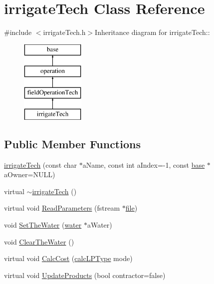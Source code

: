 \hypertarget{classirrigate_tech}{
\section{irrigateTech Class Reference}
\label{classirrigate_tech}
}


{\ttfamily \#include $<$irrigateTech.h$>$}Inheritance diagram for irrigateTech::\begin{figure}[H]
\begin{center}
\leavevmode
\includegraphics[height=4cm]{classirrigate_tech}
\end{center}
\end{figure}
\subsection*{Public Member Functions}
\begin{DoxyCompactItemize}
\item 
\hyperlink{classirrigate_tech_a2a3114ef17127272f1b30d7e50404f34}{irrigateTech} (const char $\ast$aName, const int aIndex=-\/1, const \hyperlink{classbase}{base} $\ast$aOwner=NULL)
\item 
virtual \hyperlink{classirrigate_tech_a54d46070621b3e40e31c8737626b9ba7}{$\sim$irrigateTech} ()
\item 
virtual void \hyperlink{classirrigate_tech_a8c7f11f2ce9cb7e19851c81c69c91d0a}{ReadParameters} (fstream $\ast$\hyperlink{classbase_a3af52ee9891719d09b8b19b42450b6f6}{file})
\item 
void \hyperlink{classirrigate_tech_a762110b6144118044760d998985175f0}{SetTheWater} (\hyperlink{classwater}{water} $\ast$aWater)
\item 
void \hyperlink{classirrigate_tech_a9daf92a6cfd801082fd3201fd7e4e572}{ClearTheWater} ()
\item 
virtual void \hyperlink{classirrigate_tech_a68212d5382845e1cf877f0c2b1ab1019}{CalcCost} (\hyperlink{typer_8h_af05cf854fc14086a0d6404be5ae9813f}{calcLPType} mode)
\item 
virtual void \hyperlink{classirrigate_tech_a5a125198ead652bcf1c8307fbc8ef3b5}{UpdateProducts} (bool contractor=false)
\end{DoxyCompactItemize}
